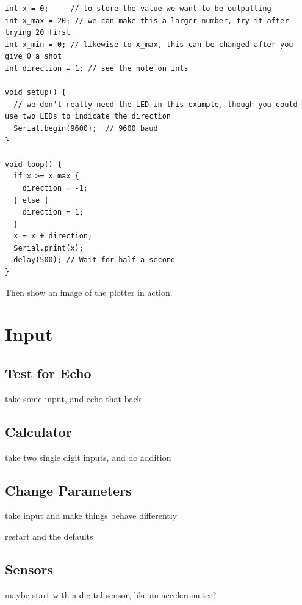 \documentclass[11pt]{book}
\begin{document}

\begin{minipage}{\linewidth}
\begin{lstlisting}[style=myArduino]
int x = 0;     // to store the value we want to be outputting
int x_max = 20; // we can make this a larger number, try it after trying 20 first
int x_min = 0; // likewise to x_max, this can be changed after you give 0 a shot
int direction = 1; // see the note on ints

void setup() {
  // we don't really need the LED in this example, though you could use two LEDs to indicate the direction
  Serial.begin(9600);  // 9600 baud
}

void loop() {
  if x >= x_max {
    direction = -1;
  } else {
    direction = 1;
  }
  x = x + direction;
  Serial.print(x);
  delay(500); // Wait for half a second
}
\end{lstlisting}
\end{minipage}

Then show an image of the plotter in action.

\section{Input}
\subsection{Test for Echo}
take some input, and echo that back

\subsection{Calculator}
take two single digit inputs, and do addition

\subsection{Change Parameters}
take input and make things behave differently

restart and the defaults

\subsection{Sensors}
maybe start with a digital sensor, like an accelerometer?
\end{document}
